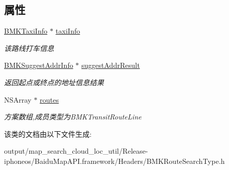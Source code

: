 \subsection*{属性}
\begin{DoxyCompactItemize}
\item 
\hypertarget{interface_b_m_k_transit_route_result_ae880202db7750ff403011f52fc3b87b7}{}\hyperlink{interface_b_m_k_taxi_info}{B\+M\+K\+Taxi\+Info} $\ast$ \hyperlink{interface_b_m_k_transit_route_result_ae880202db7750ff403011f52fc3b87b7}{taxi\+Info}\label{interface_b_m_k_transit_route_result_ae880202db7750ff403011f52fc3b87b7}

\begin{DoxyCompactList}\small\item\em 该路线打车信息 \end{DoxyCompactList}\item 
\hypertarget{interface_b_m_k_transit_route_result_ab5908f0b5471308dbd0ea14618c1b1d6}{}\hyperlink{interface_b_m_k_suggest_addr_info}{B\+M\+K\+Suggest\+Addr\+Info} $\ast$ \hyperlink{interface_b_m_k_transit_route_result_ab5908f0b5471308dbd0ea14618c1b1d6}{suggest\+Addr\+Result}\label{interface_b_m_k_transit_route_result_ab5908f0b5471308dbd0ea14618c1b1d6}

\begin{DoxyCompactList}\small\item\em 返回起点或终点的地址信息结果 \end{DoxyCompactList}\item 
\hypertarget{interface_b_m_k_transit_route_result_ad23c905161697d0549715622abd4b400}{}N\+S\+Array $\ast$ \hyperlink{interface_b_m_k_transit_route_result_ad23c905161697d0549715622abd4b400}{routes}\label{interface_b_m_k_transit_route_result_ad23c905161697d0549715622abd4b400}

\begin{DoxyCompactList}\small\item\em 方案数组,成员类型为\+B\+M\+K\+Transit\+Route\+Line \end{DoxyCompactList}\end{DoxyCompactItemize}


该类的文档由以下文件生成\+:\begin{DoxyCompactItemize}
\item 
output/map\+\_\+search\+\_\+cloud\+\_\+loc\+\_\+util/\+Release-\/iphoneos/\+Baidu\+Map\+A\+P\+I.\+framework/\+Headers/B\+M\+K\+Route\+Search\+Type.\+h\end{DoxyCompactItemize}
